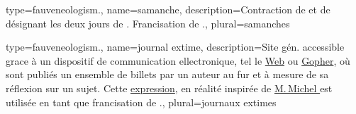 {
  type=fauveneologism.,
    name={samanche},
    description={Contraction de  et de  désignant les deux jours de . Francisation de .},
    plural={samanches}
}

{
  type=fauveneologism.,
    name={journal extime},
    description={Site gén. accessible grace à un dispositif de communication ellectronique, tel le \href{https://fr.wikipedia.org/wiki/Web}{Web} ou \href{https://fr.wikipedia.org/wiki/Gopher}{Gopher}, où sont publiés un ensemble de billets par un auteur au fur et à mesure de sa réflexion sur un sujet. Cette \href{https://fr.wikipedia.org/wiki/Journal\_extime}{expression}, en réalité inspirée de \href{https://fr.wikipedia.org/wiki/Michel\_Tournier}{M.\,Michel } est utilisée en tant que francisation de \href{https://fr.wiktionary.org/wiki/blog}{}.},
    plural={journaux extimes}
}

